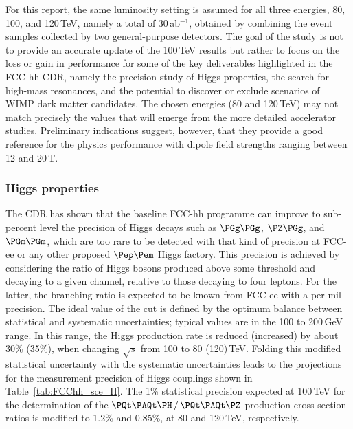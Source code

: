 For this report, the same luminosity setting is assumed for all three energies, 80, 100, and 120\,TeV, 
namely a total of 30\,ab$^{-1}$, obtained by combining the event samples collected by two general-purpose detectors. 
The goal of the study is not to provide an accurate update of the 100\,TeV results 
but rather to focus on the loss or gain in performance for some of the key deliverables highlighted in the FCC-hh CDR, 
namely the precision study of Higgs properties, the search for high-mass resonances, 
and the potential to discover or exclude scenarios of WIMP dark matter candidates. 
The chosen energies (80 and 120\,TeV) may not match precisely the values that will emerge from the more detailed accelerator studies. 
Preliminary indications suggest, however, that they provide a 
good reference for the physics performance with dipole field strengths ranging between 12 and 20\,T. 

\subsubsection{Higgs properties}

The CDR has shown that the baseline FCC-hh programme can improve to sub-percent level the precision of Higgs decays 
such as $\PGg\PGg$, $\PZ\PGg$, and $\PGm\PGm$, 
which are too rare to be detected with that kind of precision at FCC-ee or any other proposed $\epem$ Higgs factory.
This precision is achieved by considering the ratio of Higgs bosons produced above some \pt threshold 
and decaying to a given channel, relative to those decaying to four leptons. 
For the latter, the branching ratio is expected to be known from FCC-ee with a per-mil precision. 
The ideal value of the \pt cut is defined by the optimum balance between statistical and systematic uncertainties;
typical values are in the 100 to 200\,GeV range. 
In this \pt range, the Higgs production rate is reduced (increased) by about 30\% (35\%), 
when changing $\sqrt{s}$ from 100 to 80 (120)\,TeV. 
Folding this modified statistical uncertainty with the systematic uncertainties 
leads to the projections for the measurement precision of Higgs couplings shown in Table~\ref{tab:FCChh_sce_H}.  
The 1\% statistical precision expected at 100\,TeV for the determination of 
the $\PQt\PAQt\PH\,/\,\PQt\PAQt\PZ$ production cross-section ratios is modified to 1.2\% and 0.85\%, at 80 and 120\,TeV, respectively. 

